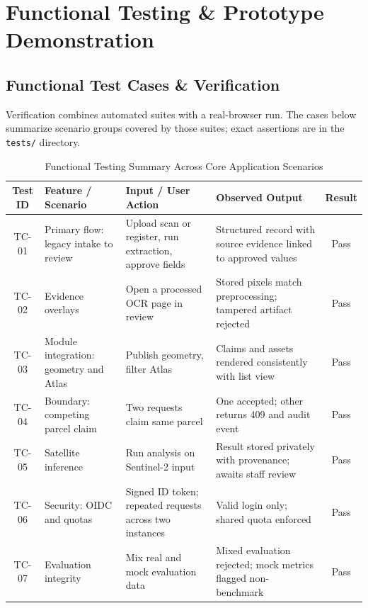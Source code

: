 \documentclass[11pt, a4paper]{article}
\begin{document}
\section{Functional Testing \& Prototype Demonstration}

\subsection{Functional Test Cases \& Verification}
\noindent
Verification combines automated suites with a real-browser run. The cases below summarize scenario groups covered by those suites; exact assertions are in the \texttt{tests/} directory.

\begin{table}[H]
    \centering
    \footnotesize
    \renewcommand{\arraystretch}{1.25}
    \begin{tabular}{|c|p{3.2cm}|p{3.4cm}|p{4.0cm}|c|}
        \hline
        \textbf{Test ID} & \textbf{Feature / Scenario} & \textbf{Input / User Action} & \textbf{Observed Output} & \textbf{Result} \\
        \hline
        TC-01 & Primary flow: legacy intake to review & Upload scan or register, run extraction, approve fields & Structured record with source evidence linked to approved values & Pass \\
        \hline
        TC-02 & Evidence overlays & Open a processed OCR page in review & Stored pixels match preprocessing; tampered artifact rejected & Pass \\
        \hline
        TC-03 & Module integration: geometry and Atlas & Publish geometry, filter Atlas & Claims and assets rendered consistently with list view & Pass \\
        \hline
        TC-04 & Boundary: competing parcel claim & Two requests claim same parcel & One accepted; other returns 409 and audit event & Pass \\
        \hline
        TC-05 & Satellite inference & Run analysis on Sentinel-2 input & Result stored privately with provenance; awaits staff review & Pass \\
        \hline
        TC-06 & Security: OIDC and quotas & Signed ID token; repeated requests across two instances & Valid login only; shared quota enforced & Pass \\
        \hline
        TC-07 & Evaluation integrity & Mix real and mock evaluation data & Mixed evaluation rejected; mock metrics flagged non-benchmark & Pass \\
        \hline
    \end{tabular}
    \caption{Functional Testing Summary Across Core Application Scenarios}
\end{table}
\end{document}

